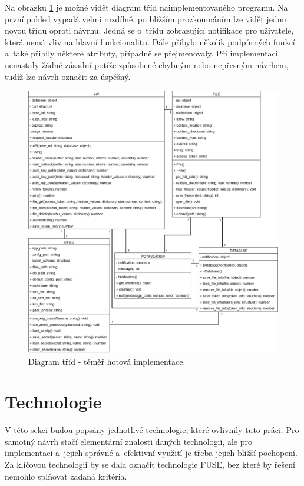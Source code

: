 Na obrázku \ref{fig:class_diagram_implementation} je možné vidět diagram tříd naimplementovaného programu. Na první pohled vypadá velmi rozdílně, po bližším prozkoumáním
lze vidět jednu novou třídu oproti návrhu. Jedná se o třídu zobrazující notifikace pro uživatele, která nemá vliv na hlavní funkcionalitu. Dále přibylo několik podpůrných
funkcí a také přibily některé atributy, případně se přejmenovaly. Při implementaci nenastaly žádné zásadní potíže způsobené chybným nebo nepřesným návrhem, tudíž lze
návrh označit za úspěšný.

\newpage

\begin{figure}[h]
    \includegraphics[width=1\linewidth]{other-fig/class_diagram_after_implementation.png}
    \caption{Diagram tříd - téměř hotová implementace.}
    \label{fig:class_diagram_implementation}
\end{figure}

\section{Technologie}

V této sekci budou popsány jednotlivé technologie, které ovlivnily tuto práci. Pro samotný návrh stačí elementární znalosti daných technologií, ale pro
implementaci a jejich správné a efektivní využití je třeba jejich bližší pochopení. Za klíčovou technologii by se dala označit technologie FUSE, bez které
by řešení nemohlo splňovat zadaná kritéria.

